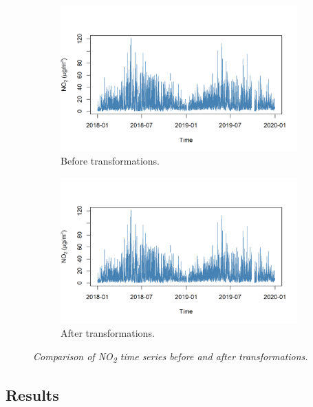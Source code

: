 \documentclass[a4paper, 10pt]{article}
\begin{document}
\begin{flushleft}
      \begin{figure}[H]
         \centering
         \begin{subfigure}{0.48\linewidth}
            \centering
            \includegraphics[width=\linewidth]{../img/raw_no2.png}
            \caption{Before transformations.}
         \end{subfigure}
         \hfill
         \begin{subfigure}{0.48\linewidth}
            \centering
            \includegraphics[width=\linewidth]{../img/raw_no2.png}
            \caption{After transformations.}
         \end{subfigure}
         \caption{\textit{Comparison of NO\textsubscript{2} time series before and after transformations.}}
      \end{figure}

      \subsection*{Results}


\end{flushleft}
\end{document}
